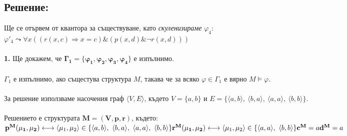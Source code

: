 \documentclass[french]{article}
\begin{document}
\subsection*{{\Large Решение:}}
	{\Large 
	Ще се отървем от квантора за съществуване, като \textit{скуленизираме} $\varphi_4$: \\
	$\varphi'_4	\leadsto \forall x((r(x,c)\Rightarrow x = c) \& (p(x,d) \& \neg r(x,d)))$ \\
	\\
	\textbf{1.} Ще докажем, че $ \mathbf{ \Gamma_1 = \{\varphi_1,\varphi_2,\varphi_3,\varphi_4\} } $ е изпълнимо. \\
	\\
	$\Gamma_1$ е изпълнимо, ако същестува структура $M$, такава че за всяко $\varphi \in \Gamma_1$ е вярно $M \models \varphi$. \\
	\\
	За решение използваме насочения граф $ \langle V,E \rangle $, където $ V = \{a,b\} $ и $ E = \{\langle a,b \rangle,\ \langle b,a \rangle,\ \langle a,a \rangle,\ \langle b,b \rangle\} $. \\
	\\
	Решението е структурата $\mathbf{ M = (V, p, r) } $, където: \\
	$ \mathbf{ p^M (\mu_1, \mu_2) } \longleftrightarrow \langle \mu_1,\mu_2 \rangle \in \{\langle a,b \rangle,\ \langle b,a \rangle,\ \langle a,a \rangle,\ \langle b,b \rangle\} \\
	\mathbf{ r^M (\mu_1, \mu_2) } \longleftrightarrow \langle \mu_1,\mu_2 \rangle \in \{\langle a,a \rangle,\ \langle b,b \rangle\} \\ 
	\mathbf{ c^M } = a \\
	\mathbf{ d^M } = a \\ $
	}
\end{document}
